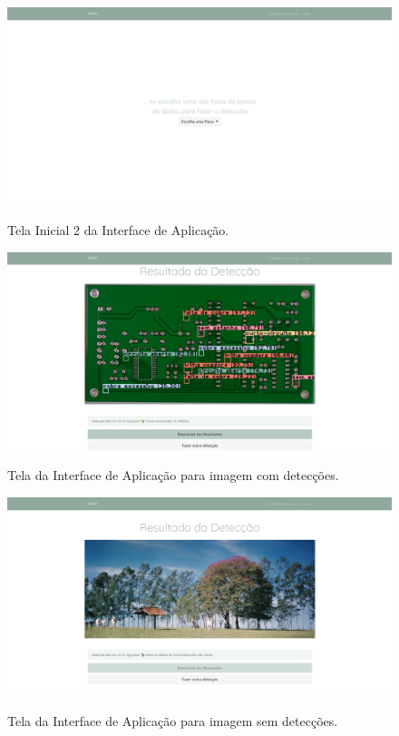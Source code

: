 \begin{landscape}
  \begin{figure}[H] %
    \centering
    \caption{Tela Inicial 2 da Interface de Aplicação.}
    \includegraphics[scale=0.36]{img/api/2.png}
    \label{fig:resultados-api-2}
  \end{figure}
\end{landscape}

\begin{landscape}
  \begin{figure}[H] %
    \centering
    \caption{Tela da Interface de Aplicação para imagem com detecções.}
    \includegraphics[scale=0.36]{img/api/3.png}
    \label{fig:resultados-api-3}
  \end{figure}
\end{landscape}

\begin{landscape}
  \begin{figure}[H] %
    \centering
    \caption{Tela da Interface de Aplicação para imagem sem detecções.}
    \includegraphics[scale=0.36]{img/api/5.png}
    \label{fig:resultados-api-5}
  \end{figure}
\end{landscape}
